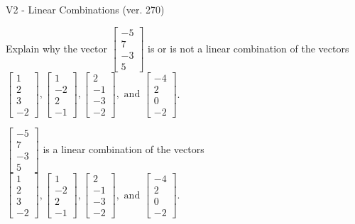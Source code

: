 \begin{exercise}
  \begin{exerciseTitle}V2 - Linear Combinations (ver. 270)\end{exerciseTitle}
  \begin{exerciseStatement}
    Explain why the vector \(\left[\begin{array}{c}
-5 \\
7 \\
-3 \\
5
\end{array}\right]\)  is or is not a linear 
	combination of the vectors \(\left[\begin{array}{c}
1 \\
2 \\
3 \\
-2
\end{array}\right] , \left[\begin{array}{c}
1 \\
-2 \\
2 \\
-1
\end{array}\right] , \left[\begin{array}{c}
2 \\
-1 \\
-3 \\
-2
\end{array}\right] , \text{ and } \left[\begin{array}{c}
-4 \\
2 \\
0 \\
-2
\end{array}\right]\).
	


  \end{exerciseStatement}
  \begin{exerciseAnswer}
   \(\left[\begin{array}{c}
-5 \\
7 \\
-3 \\
5
\end{array}\right]\) 
  	 is  
	a linear combination of the vectors \(\left[\begin{array}{c}
1 \\
2 \\
3 \\
-2
\end{array}\right] , \left[\begin{array}{c}
1 \\
-2 \\
2 \\
-1
\end{array}\right] , \left[\begin{array}{c}
2 \\
-1 \\
-3 \\
-2
\end{array}\right] , \text{ and } \left[\begin{array}{c}
-4 \\
2 \\
0 \\
-2
\end{array}\right]\).


\end{exerciseAnswer}
\end{exercise}
